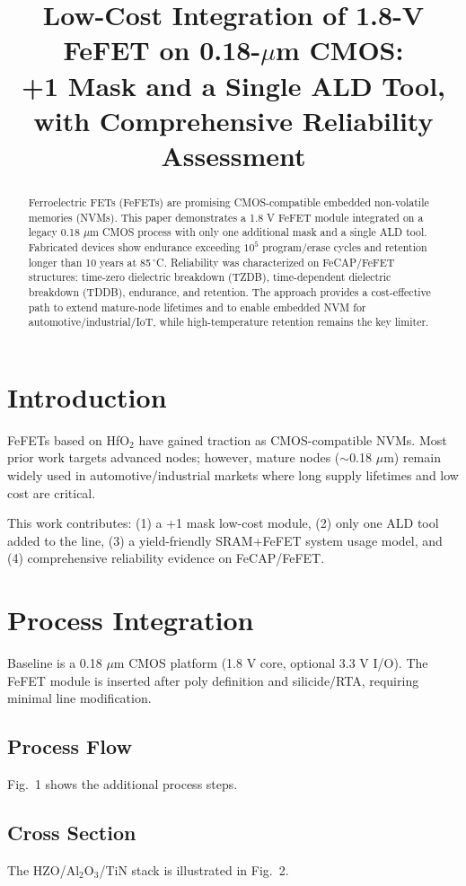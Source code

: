 \documentclass[conference]{IEEEtran}
\title{Low-Cost Integration of 1.8-V FeFET on 0.18-\texorpdfstring{$\mu$m}{µm} CMOS:\\
+1 Mask and a Single ALD Tool, with Comprehensive Reliability Assessment}
\author{\IEEEauthorblockN{Shinichi Samizo}
\IEEEauthorblockA{Independent Semiconductor Researcher\\
Former Engineer at Seiko Epson Corporation\\
Email: shin372@gmail.com, GitHub: \texttt{https://github.com/Samizo-AITL}}}
\begin{document}
\maketitle

\begin{abstract}
Ferroelectric FETs (FeFETs) are promising CMOS-compatible embedded non-volatile memories (NVMs).  
This paper demonstrates a 1.8 V FeFET module integrated on a legacy 0.18 $\mu$m CMOS process with only one additional mask and a single ALD tool.  
Fabricated devices show endurance exceeding $10^{5}$ program/erase cycles and retention longer than 10 years at 85\,$^\circ$C.  
Reliability was characterized on FeCAP/FeFET structures: time-zero dielectric breakdown (TZDB), time-dependent dielectric breakdown (TDDB), endurance, and retention.  
The approach provides a cost-effective path to extend mature-node lifetimes and to enable embedded NVM for automotive/industrial/IoT, while high-temperature retention remains the key limiter.
\end{abstract}

\section{Introduction}
FeFETs based on HfO$_2$ have gained traction as CMOS-compatible NVMs.  
Most prior work targets advanced nodes; however, mature nodes ($\sim$0.18 $\mu$m) remain widely used in automotive/industrial markets where long supply lifetimes and low cost are critical.  

This work contributes:  
(1) a +1 mask low-cost module,  
(2) only one ALD tool added to the line,  
(3) a yield-friendly SRAM+FeFET system usage model, and  
(4) comprehensive reliability evidence on FeCAP/FeFET.

\section{Process Integration}
Baseline is a 0.18 $\mu$m CMOS platform (1.8 V core, optional 3.3 V I/O).  
The FeFET module is inserted after poly definition and silicide/RTA, requiring minimal line modification.  

\subsection{Process Flow}
Fig.~1 shows the additional process steps.  
\subsection{Cross Section}
The HZO/Al$_2$O$_3$/TiN stack is illustrated in Fig.~2.
\end{document}
